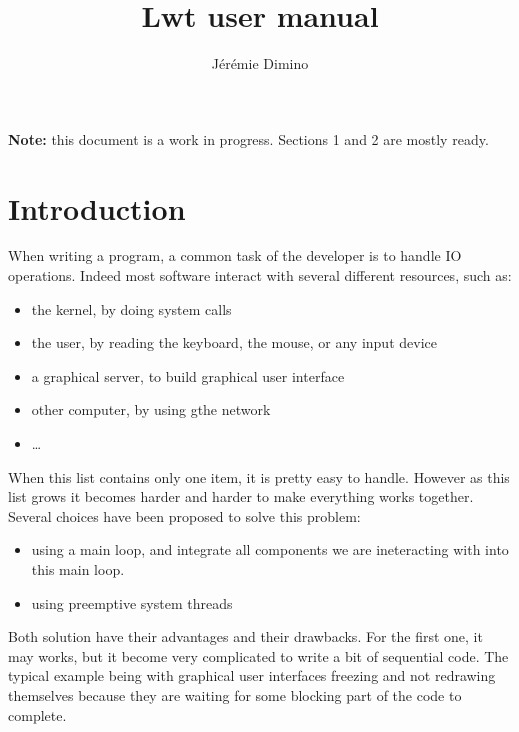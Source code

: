 \documentclass{article}
\title{Lwt user manual}
\author{Jérémie Dimino}
\begin{document}
\maketitle

\textbf{Note:} this document is a work in progress. Sections 1 and 2
are mostly ready.


\setcounter{tocdepth}{3}
\tableofcontents

\section{Introduction}

When writing a program, a common task of the developer is to handle IO
operations. Indeed most software interact with several different
resources, such as:

\begin{itemize}
\item the kernel, by doing system calls
\item the user, by reading the keyboard, the mouse, or any input
  device
\item a graphical server, to build graphical user interface
\item other computer, by using gthe network
\item \dots
\end{itemize}

When this list contains only one item, it is pretty easy to
handle. However as this list grows it becomes harder and harder to
make everything works together. Several choices have been proposed to
solve this problem:

\begin{itemize}
\item using a main loop, and integrate all components we are
  ineteracting with into this main loop.
\item using preemptive system threads
\end{itemize}

Both solution have their advantages and their drawbacks. For the first
one, it may works, but it become very complicated to write a bit of
sequential code. The typical example being with graphical user
interfaces freezing and not redrawing themselves because they are
waiting for some blocking part of the code to complete.
\end{document}
